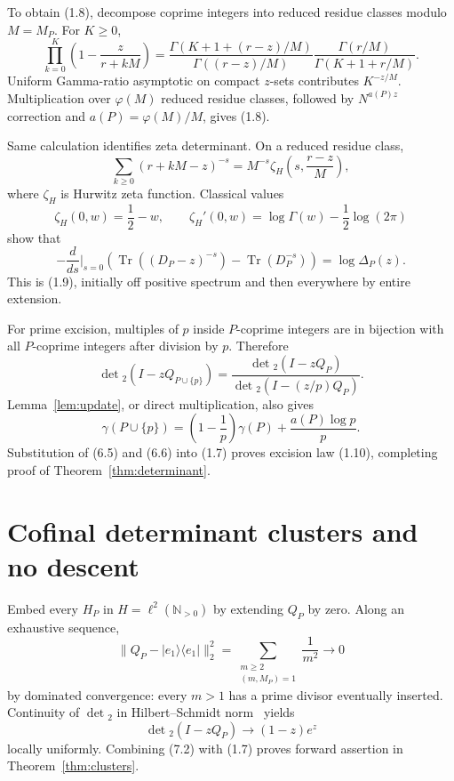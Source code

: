 \documentclass[11pt]{article}
\theoremstyle{definition}
\theoremstyle{remark}
\newcommand{\N}{\mathbb N}
\newcommand{\Tr}{\operatorname{Tr}}
\newcommand{\norm}[1]{\lVert #1\rVert}
\begin{document}
To obtain (1.8), decompose coprime integers into reduced residue classes modulo $M=M_P$.
For $K\geq0$,
\begin{equation}
 \prod_{k=0}^{K}\left(1-\frac{z}{r+kM}\right)
 =\frac{\Gamma(K+1+(r-z)/M)}{\Gamma((r-z)/M)}
  \frac{\Gamma(r/M)}{\Gamma(K+1+r/M)}.                   \tag{6.3}
\end{equation}
Uniform Gamma-ratio asymptotic on compact $z$-sets contributes $K^{-z/M}$.  Multiplication over
$\varphi(M)$ reduced residue classes, followed by $N^{a(P)z}$ correction and
$a(P)=\varphi(M)/M$, gives (1.8).

Same calculation identifies zeta determinant.  On a reduced residue class,
\[
 \sum_{k\geq0}(r+kM-z)^{-s}=M^{-s}\zeta_H\left(s,\frac{r-z}{M}\right),
\]
where $\zeta_H$ is Hurwitz zeta function.  Classical values
\begin{equation}
 \zeta_H(0,w)=\frac12-w,\qquad
 \zeta_H'(0,w)=\log\Gamma(w)-\frac12\log(2\pi)            \tag{6.4}
\end{equation}
show that
\[
 -\frac{d}{ds}\bigg|_{s=0}
 \left(\Tr((D_P-z)^{-s})-\Tr(D_P^{-s})\right)
 =\log\Delta_P(z).
\]
This is (1.9), initially off positive spectrum and then everywhere by entire extension.

For prime excision, multiples of $p$ inside $P$-coprime integers are in bijection with all
$P$-coprime integers after division by $p$.  Therefore
\begin{equation}
 \det{}_2(I-zQ_{P\cup\{p\}})
 =\frac{\det{}_2(I-zQ_P)}{\det{}_2(I-(z/p)Q_P)}.           \tag{6.5}
\end{equation}
Lemma~\ref{lem:update}, or direct multiplication, also gives
\begin{equation}
 \gamma(P\cup\{p\})
 =\left(1-\frac1p\right)\gamma(P)+\frac{a(P)\log p}{p}.  \tag{6.6}
\end{equation}
Substitution of (6.5) and (6.6) into (1.7) proves excision law (1.10), completing proof of
Theorem~\ref{thm:determinant}.

\section{Cofinal determinant clusters and no descent}
\label{sec:nodescent}

Embed every $H_P$ in $H=\ell^2(\N_{>0})$ by extending $Q_P$ by zero.  Along an exhaustive
sequence,
\begin{equation}
 \norm{Q_P-|e_1\rangle\langle e_1|}_2^2
 =\sum_{\substack{m\geq2\\(m,M_P)=1}}\frac1{m^2}
 \longrightarrow0                                         \tag{7.1}
\end{equation}
by dominated convergence: every $m>1$ has a prime divisor eventually inserted.
Continuity of $\det{}_2$ in Hilbert--Schmidt norm~\cite{Simon2005} yields
\begin{equation}
 \det{}_2(I-zQ_P)\longrightarrow(1-z)e^z                \tag{7.2}
\end{equation}
locally uniformly.  Combining (7.2) with (1.7) proves forward assertion in
Theorem~\ref{thm:clusters}.
\end{document}
